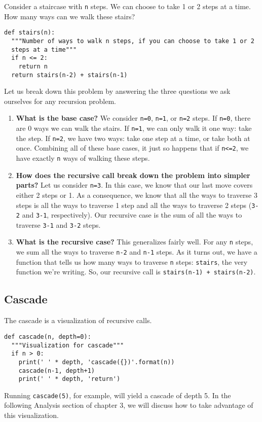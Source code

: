 \documentclass[a4paper]{book}
\begin{document}
Consider a staircase with {\tt n} steps. We can choose to take 1 or 2 steps at a time. How many ways can we walk these stairs?
\begin{lstlisting}
def stairs(n):
  """Number of ways to walk n steps, if you can choose to take 1 or 2 
  steps at a time"""
  if n <= 2:
    return n
  return stairs(n-2) + stairs(n-1)
\end{lstlisting}
Let us break down this problem by answering the three questions we ask ourselves for any recursion problem.
\begin{enumerate}
\item \textbf{What is the base case?} We consider {\tt n=0}, {\tt n=1}, or {\tt n=2} steps. If {\tt n=0}, there are 0 ways we can walk the stairs. If {\tt n=1}, we can only walk it one way: take the step. If {\tt n=2}, we have two ways: take one step at a time, or take both at once. Combining all of these base cases, it just so happens that if {\tt n<=2}, we have exactly {\tt n} ways of walking these steps.
\item \textbf{How does the recursive call break down the problem into simpler parts?} Let us consider {\tt n=3}. In this case, we know that our last move covers either 2 steps or 1. As a consequence, we know that all the ways to traverse 3 steps is all the ways to traverse 1 step and all the ways to traverse 2 steps ({\tt 3-2} and {\tt 3-1}, respectively). Our recursive case is the sum of all the ways to traverse {\tt 3-1} and {\tt 3-2} steps.
\item \textbf{What is the recursive case?} This generalizes fairly well. For any {\tt n} steps, we sum all the ways to traverse {\tt n-2} and {\tt n-1} steps. As it turns out, we have a function that tells us how many ways to traverse {\tt n} steps: {\tt stairs}, the very function we're writing. So, our recursive call is {\tt stairs(n-1) + stairs(n-2)}.
\end{enumerate}
\subsection{Cascade}
The cascade is a visualization of recursive calls. 
\begin{lstlisting}
def cascade(n, depth=0):
  """Visualization for cascade"""
  if n > 0:
    print(' ' * depth, 'cascade({})'.format(n))
    cascade(n-1, depth+1)
    print(' ' * depth, 'return')
\end{lstlisting}
Running {\tt cascade(5)}, for example, will yield a cascade of depth 5. In the following Analysis section of chapter 3, we will discuss how to take advantage of this visualization.
\end{document}

